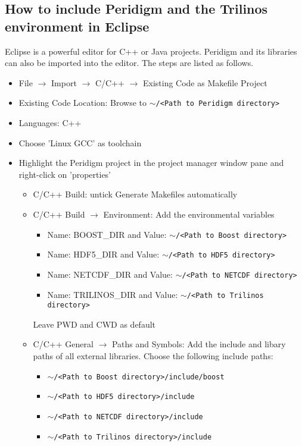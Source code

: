  \subsection{How to include Peridigm and the Trilinos environment in Eclipse}
  Eclipse is a powerful editor for C++ or Java projects. Peridigm and its libraries can also be imported into the editor. The steps are listed as follows. 
  \begin{itemize}
   \item File $\rightarrow$ Import $\rightarrow$ C/C++ $\rightarrow$ Existing Code as Makefile Project
   \item Existing Code Location: Browse to $\sim$\texttt{/<Path to Peridigm directory>}
   \item Languages: C++
   \item Choose 'Linux GCC' as toolchain
   \item Highlight the Peridigm project in the project manager window pane and right-click on 'properties'
   \begin{itemize}
    \item C/C++ Build: untick Generate Makefiles automatically
    \item C/C++ Build $\rightarrow$ Environment: Add the environmental variables 
    \begin{itemize}
     \item Name: BOOST\_DIR and Value: $\sim$\texttt{/<Path to Boost directory>}
     \item Name: HDF5\_DIR and Value: $\sim$\texttt{/<Path to HDF5 directory>}
     \item Name: NETCDF\_DIR and Value: $\sim$\texttt{/<Path to NETCDF directory>} 
     \item Name: TRILINOS\_DIR and Value: $\sim$\texttt{/<Path to Trilinos directory>}
    \end{itemize}
    Leave PWD and CWD as default
    \item C/C++ General $\rightarrow$ Paths and Symbols: Add the include and libary paths of all external libraries. Choose the following include paths:
    \begin{itemize}
     \item $\sim$\texttt{/<Path to Boost directory>/include/boost}
     \item $\sim$\texttt{/<Path to HDF5 directory>/include}
     \item $\sim$\texttt{/<Path to NETCDF directory>/include}
     \item $\sim$\texttt{/<Path to Trilinos directory>/include}

\end{itemize}
\end{itemize}
\end{itemize}
